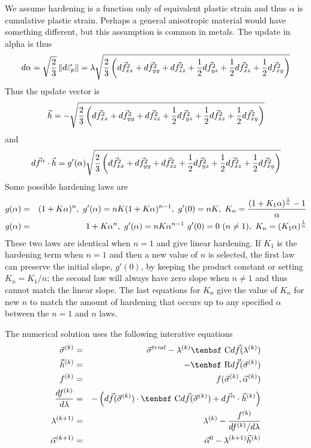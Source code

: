 \documentclass[11pt]{article}
\def\C{\hbox{\tenbsf C}}
\def\dpl{d \vec{\varepsilon}_{p}}
\def\df{d \vec{f}}
\def\dfa{d \vec{f}^\alpha}
\def\R{\hbox{\tenbsf R}}
\def\s#1{\sigma_{#1}}
\begin{document}
We assume hardening is a function only of equivalent plastic strain and thus $\alpha$ is cumulative plastic strain. Perhaps a general anisotropic material would have something different, but this assumption is common in metals. The update in alpha is thus
\begin{equation}
     d\alpha = \sqrt{2\over 3}\thinspace \| \dpl\| = \lambda \sqrt{{2\over 3}\left(\df_{xx}^2 + \df_{yy}^2 + \df_{zz}^2 + {1\over2}\df_{yz}^2+ {1\over2}\df_{xz}^2+ {1\over2}\df_{xy}^2\right)}
\end{equation}
Thus the update vector is
\begin{equation}
      \vec h = - \sqrt{{2\over 3}\left(\df_{xx}^2 + \df_{yy}^2 + \df_{zz}^2 + {1\over2}\df_{yz}^2+ {1\over2}\df_{xz}^2+ {1\over2}\df_{xy}^2\right)}
\end{equation}
and
\begin{equation}
   \dfa \cdot \vec h =  g'(\alpha)\sqrt{{2\over 3}\left(\df_{xx}^2 + \df_{yy}^2 + \df_{zz}^2 + {1\over2}\df_{yz}^2+ {1\over2}\df_{xz}^2 + {1\over2}\df_{xy}^2\right)}
\end{equation}
Some possible hardening laws are
\begin{eqnarray}
     g(\alpha)  & = & (1 + K\alpha)^n, \  g'(\alpha) =  nK(1+K\alpha)^{n-1}, \  g'(0)=nK, \  K_n={(1+K_1\alpha)^{1\over n} - 1\over \alpha}  \\
     g(\alpha)  & = & 1 + K\alpha^n, \  g'(\alpha) =  nK\alpha^{n-1} \  g'(0)=0\ (n\ne1), \ K_n = (K_1\alpha)^{1\over n}
\end{eqnarray}
These two laws are identical when $n=1$ and give linear hardening. If $K_1$ is the hardening term when $n=1$ and then a new value of $n$ is selected, the first law can preserve the initial slope, $g'(0)$, by keeping the product constant or setting $K_n = K_1/n$; the second law will always have zero slope when $n\ne1$ and thus cannot match the linear slope. The last equations for $K_n$ give the value of $K_n$ for new $n$ to match the amount of hardening that occurs up to any specified $\alpha$ between the $n=1$ and $n$ laws.

The numerical solution uses the following interative equations
\begin{eqnarray}
       \vec\sigma^{(k)} & = & \vec\s{}^{trial} - \lambda^{(k)}\C\df(\lambda^{(k)}) \\
        \vec h^{(k)} & = & -\R\df(\vec\sigma^{(k)}) \\
        f^{(k)} & = &  f( \vec\sigma^{(k)},\vec\alpha^{(k)})  \\
        {df^{(k)}\over d\lambda} & = & -\left( \df(\vec\sigma^{(k)})\cdot \C\df(\vec\sigma^{(k)})  + \dfa \cdot \vec h^{(k)}\right) \\
        \lambda^{(k+1)} & = & \lambda^{(k)} - {f^{(k)} \over {df^{(k)}/ d\lambda} } \\
        \vec\alpha^{(k+1)} & = & \vec\alpha^{0} -  \lambda^{(k+1)} \vec h^{(k)}
\end{eqnarray}
\end{document}
